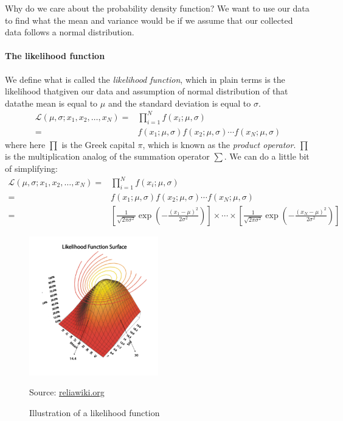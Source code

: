 \documentclass[12pt,english]{article}
\begin{document}
Why do we care about the probability density function? We want to use our data to find what the mean and variance would be if we assume that our collected data follows a normal distribution.

\paragraph{The likelihood function}

We define what is called the \emph{likelihood function}, which in plain terms is the likelihood that\textemdash given our data and assumption of normal distribution of that data\textemdash the mean is equal to $\mu$ and the standard deviation is equal to $\sigma$.
\begin{align}
\mathcal{L}\left(\mu,\sigma;x_{1},x_{2},\ldots,x_{N}\right)= & \prod_{i=1}^{N}f\left(x_{i};\mu,\sigma\right)\label{eq:7}\\
= & f\left(x_{1};\mu,\sigma\right)f\left(x_{2};\mu,\sigma\right)\cdots f\left(x_{N};\mu,\sigma\right)\nonumber 
\end{align}
where here $\prod$ is the Greek capital $\pi$, which is known as the \emph{product operator}. $\prod$ is the multiplication analog of the summation operator $\sum$. We can do a little bit of simplifying:
\begin{align}
\mathcal{L}\left(\mu,\sigma;x_{1},x_{2},\ldots,x_{N}\right)= & \prod_{i=1}^{N}f\left(x_{i};\mu,\sigma\right)\nonumber \\
= & f\left(x_{1};\mu,\sigma\right)f\left(x_{2};\mu,\sigma\right)\cdots f\left(x_{N};\mu,\sigma\right)\nonumber \\
= & \left[\frac{1}{\sqrt{2\pi\sigma^{2}}}\exp\left(-\frac{\left(x_{1}-\mu\right)^{2}}{2\sigma^{2}}\right)\right]\times\cdots\times\left[\frac{1}{\sqrt{2\pi\sigma^{2}}}\exp\left(-\frac{\left(x_{N}-\mu\right)^{2}}{2\sigma^{2}}\right)\right]\label{eq:8}
\end{align}

\begin{figure}[ht!]
\caption{Illustration of a likelihood function}
\label{fig:mle}
\centering
\includegraphics[width=0.5\textwidth]{../Graphics/350px-Apa_fig3}

{\raggedright {\footnotesize Source: \url{reliawiki.org}}}
\end{figure}
\end{document}

